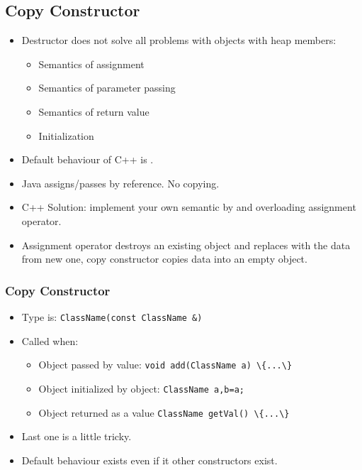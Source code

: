 \subsection{Copy Constructor}
\begin{frame}
\begin{itemize}[<+->]
\item Destructor does not solve all problems with objects with heap members:
\begin{itemize}
\item Semantics of assignment
\item Semantics of parameter passing
\item Semantics of return value
\item Initialization
\end{itemize}
\item Default behaviour of C++ is .
\item Java assigns/passes by reference. No copying.
\item C++ Solution: implement your own semantic by  and
	overloading assignment operator.
\item Assignment operator destroys an existing object and replaces with the data from new one,
copy constructor copies data into an empty object.
\end{itemize}
\end{frame}

\begin{frame}
\frametitle{Copy Constructor}
\begin{itemize}
\item Type is: \lstinline!ClassName(const ClassName &)! 
\item Called when:
\begin{itemize}
\item Object passed by value: \lstinline!void add(ClassName a) \{...\}!
\item Object initialized by object: \lstinline!ClassName a,b=a;!
\item Object returned as a value \lstinline!ClassName getVal() \{...\}!
\end{itemize}
\item Last one is a little tricky.
\item Default behaviour exists even if it other constructors exist.
\end{itemize}
\end{frame}

\newcommand{\R}[2]{\tikz [remember picture,overlay] \node (#1) {#2};}

